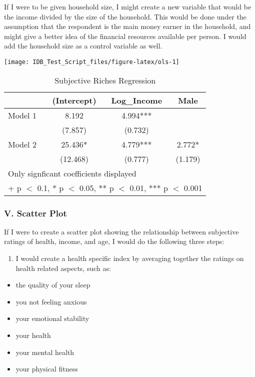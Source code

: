 \documentclass[
]{article}
\providecommand{\tightlist}{%
  \setlength{\itemsep}{0pt}\setlength{\parskip}{0pt}}
\begin{document}
If I were to be given household size, I might create a new variable that
would be the income divided by the size of the household. This would be
done under the assumption that the respondent is the main money earner
in the household, and might give a better idea of the financial
resources available per person. I would add the household size as a
control variable as well.

\begin{center}\texttt{[image: IDB\_Test\_Script\_files/figure-latex/ols-1]} \end{center}

\begin{table}

\caption{\label{tab:ols}Subjective Riches Regression}
\centering
\begin{tabular}[t]{lccc}
\toprule
  & (Intercept) & Log\_Income & Male\\
\midrule
Model 1 & \num{8.192} & \num{4.994}*** & \\
 & (\num{7.857}) & (\num{0.732}) & \\
Model 2 & \num{25.436}* & \num{4.779}*** & \num{2.772}*\\
 & (\num{12.468}) & (\num{0.777}) & (\num{1.179})\\
\bottomrule
\multicolumn{4}{l}{\rule{0pt}{1em}Only signficant coefficients displayed}\\
\multicolumn{4}{l}{\rule{0pt}{1em}+ p $<$ 0.1, * p $<$ 0.05, ** p $<$ 0.01, *** p $<$ 0.001}\\
\end{tabular}
\end{table}

\hypertarget{v.-scatter-plot}{%
\subsubsection{V. Scatter Plot}\label{v.-scatter-plot}}

If I were to create a scatter plot showing the relationship between
subjective ratings of health, income, and age, I would do the following
three steps:

\begin{enumerate}
\def\labelenumi{\arabic{enumi}.}
\tightlist
\item
  I would create a health specific index by averaging together the
  ratings on health related aspects, such as:
\end{enumerate}

\begin{itemize}
\tightlist
\item
  the quality of your sleep
\item
  you not feeling anxious
\item
  your emotional stability
\item
  your health
\item
  your mental health
\item
  your physical fitness
\end{itemize}
\end{document}
